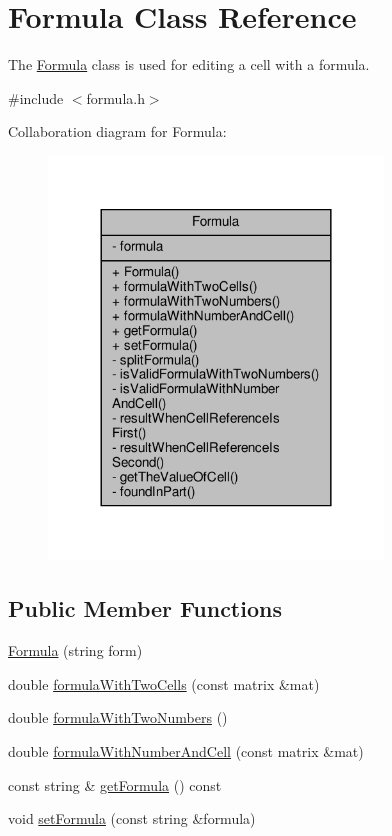 \hypertarget{class_formula}{}\section{Formula Class Reference}
\label{class_formula}


The \hyperlink{class_formula}{Formula} class is used for editing a cell with a formula.  




{\ttfamily \#include $<$formula.\+h$>$}



Collaboration diagram for Formula\+:
\nopagebreak
\begin{figure}[H]
\begin{center}
\leavevmode
\includegraphics[width=252pt]{class_formula__coll__graph}
\end{center}
\end{figure}
\subsection*{Public Member Functions}
\begin{DoxyCompactItemize}
\item 
\hyperlink{class_formula_aed38ad076eb638148bcbe867d6acea60}{Formula} (string form)
\item 
double \hyperlink{class_formula_a518bc97bd50f1cc5573be7d3f8cb6253}{formula\+With\+Two\+Cells} (const matrix \&mat)
\item 
double \hyperlink{class_formula_a2159ffdb34d80f2bee422eee89fc871a}{formula\+With\+Two\+Numbers} ()
\item 
double \hyperlink{class_formula_a0f831b2ee98fbeb7df371f83ee7d374d}{formula\+With\+Number\+And\+Cell} (const matrix \&mat)
\item 
const string \& \hyperlink{class_formula_a1b9557287ed502f9523c5c7b1805bac1}{get\+Formula} () const
\item 
void \hyperlink{class_formula_aba7633655dad414ed0a1d92cdba38163}{set\+Formula} (const string \&formula)
\end{DoxyCompactItemize}
